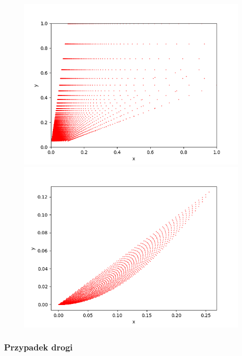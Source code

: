 \documentclass{article}
\begin{document}
    \begin{figure}[ht]
        \centering
        \begin{minipage}{.5\textwidth}
            \centering
            \includegraphics[width=\linewidth]{ujemneNN}
        \end{minipage}%
        \begin{minipage}{.5\textwidth}
            \centering
            \includegraphics[width=\linewidth]{ujemneNNN}
        \end{minipage}%
    \end{figure}

    \subsubsection{Przypadek drogi}
\end{document}
